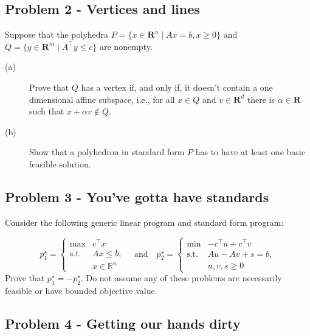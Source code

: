 \documentclass[11pt]{article}
\newcommand{\RR}{\mathbf{R}}
\begin{document}
\subsection*{Problem 2 - Vertices and lines}
\label{sec:orge03734d}
Suppose that the polyhedra \(P = \{x \in \RR^{n} \mid Ax = b, x \geq 0\}\) and \(Q= \{y \in \RR^m \mid A^{\top}y \leq c\}\) are nonempty.
\begin{description}
\item[(a)] Prove that $Q$ has a vertex if, and only if, it doesn't contain a one dimensional affine subspace, i.e., for all $x \in Q$ and $v \in \RR^{d}$ there is $\alpha \in \RR$ such that $x + \alpha v \not\in Q$.
\item[(b)] Show that a polyhedron in standard form $P$ has to have at least one basic feasible solution.
\end{description}
\subsection*{Problem 3 - You've gotta have standards}
\label{sec:org394db3d}
Consider the following generic linear program and standard form program:

\begin{equation*}
p_{1}^{\star} = \left\{
\begin{array}{ll}
\max   & c^\top x \\
\text{s.t.} & Ax \leq b, \\
                  & x \in \mathbb{R}^n
\end{array}
\right.
\quad \text{and} \quad
p_{2}^{\star} = \left\{
\begin{array}{ll}
\min   & -c^\top u + c^{\top} v \\
\text{s.t.} & Au - Av + s = b, \\
                  & u, v, s \geq 0
\end{array}
\right.
\end{equation*}
Prove that \(p^\star_1 = - p_2^\star\). Do not assume any of these problems are necessarily feasible or have bounded objective value.
\subsection*{Problem 4 - Getting our hands dirty}
\label{sec:orge838090}
\end{document}

